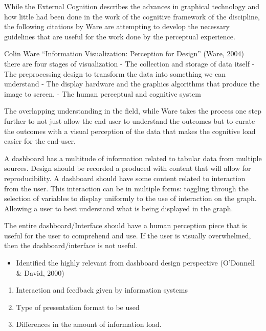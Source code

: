 \documentclass[print]{nuthesis}
\providecommand{\tightlist}{%
  \setlength{\itemsep}{0pt}\setlength{\parskip}{0pt}}
\begin{document}
While the External Cognition describes the advances in graphical technology and how little had been done in the work of the cognitive framework of the discipline, the following citations by Ware are attempting to develop the necessary guidelines that are useful for the work done by the perceptual experience.

Colin Ware ``Information Visualization: Perception for Design'' (Ware, 2004) there are four stages of visualization
- The collection and storage of data itself
- The preprocessing design to transform the data into something we can understand
- The display hardware and the graphics algorithms that produce the image to screen.
- The human perceptual and cognitive system

The overlapping understanding in the field, while Ware takes the process one step further to not just allow the end user to understand the outcomes but to curate the outcomes with a visual perception of the data that makes the cognitive load easier for the end-user.

A dashboard has a multitude of information related to tabular data from multiple sources. Design should be recorded a produced with content that will allow for reproducibility. A dashboard should have some content related to interaction from the user. This interaction can be in multiple forms: toggling through the selection of variables to display uniformly to the use of interaction on the graph. Allowing a user to best understand what is being displayed in the graph.

The entire dashboard/Interface should have a human perception piece that is useful for the user to comprehend and use. If the user is visually overwhelmed, then the dashboard/interface is not useful.

\begin{itemize}
\tightlist
\item
  Identified the highly relevant from dashboard design perspective (O'Donnell \& David, 2000)
\end{itemize}

\begin{enumerate}
\def\labelenumi{\arabic{enumi}.}
\tightlist
\item
  Interaction and feedback given by information systems
\item
  Type of presentation format to be used
\item
  Differences in the amount of information load.
\end{enumerate}
\end{document}
